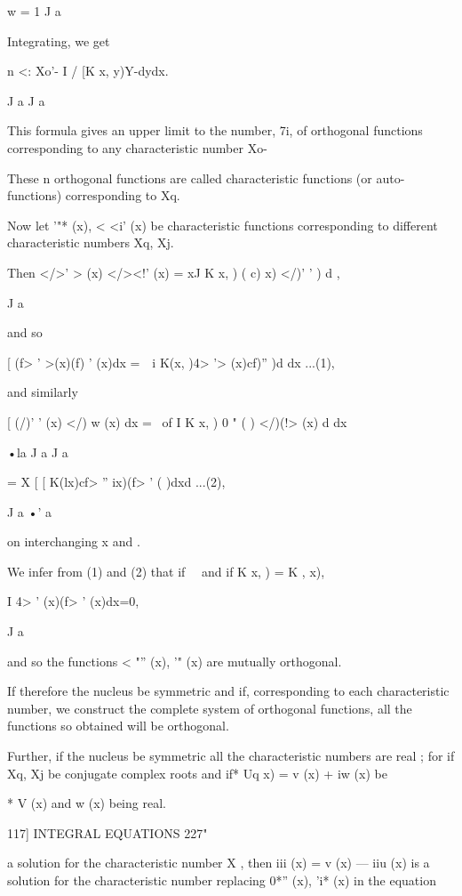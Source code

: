 {w = 1 J a 

Integrating, we get 

n <: Xo'- I / [K x, y)Y-dydx. 

J a J a 

This formula gives an upper limit to the number, 7i, of orthogonal functions 
corresponding to any characteristic number Xo- 

These n orthogonal functions are called characteristic functions (or auto- 
functions) corresponding to Xq. 

Now let  '"* (x), < <i' (x) be characteristic functions corresponding to 
different characteristic numbers Xq, Xj. 

Then </>' > (x) </><!' (x) = xJ K  x,  ) ( c)  x) </)' '   ) d , 

J a 

and so 

[ (f> ' >(x)(f) ' (x)dx = \,\ i K(x, )4> '> (x)cf)''   )d dx ...(1), 

and similarly 

[ (/)' ' (x) </) w (x) dx = \ of I K  x,  ) 0 " ( ) </)(!> (x) d dx 

•la J a J a 

= X [ [ K(lx)cf> '' ix)(f> ' ( )dxd  ...(2), 

J a •' a 

on interchanging x and  . 

We infer from (1) and (2) that if \   \ and if K  x,  ) = K  , x), 

I 4> ' (x)(f> ' (x)dx=0, 

J a 

and so the functions < "'' (x),  '" (x) are mutually orthogonal. 

If therefore the nucleus be symmetric and if, corresponding to each 
characteristic number, we construct the complete system of orthogonal 
functions, all the functions so obtained will be orthogonal. 

Further, if the nucleus be symmetric all the characteristic numbers are 
real ; for if Xq, Xj be conjugate complex roots and if* Uq  x) = v (x) + iw (x) be 

* V (x) and w (x) being real. 



117] INTEGRAL EQUATIONS 227" 

a solution for the characteristic number X , then iii (x) = v (x) — iiu (x) is 
a solution for the characteristic number \; replacing 0*'' (x),  'i* (x) in the 
equation 

}
